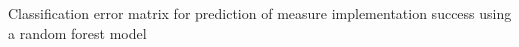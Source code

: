 Classification error matrix for prediction of measure implementation success using a random forest model
\label{fig:measurimp_classification}